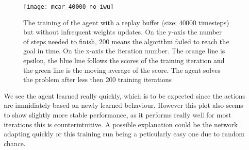 \begin{figure}
    \texttt{[image: mcar\_40000\_no\_iwu]}
    \caption{The training of the agent with a replay buffer (size: $40000$ timesteps) but without infrequent weights updates. On the y-axis the number of steps needed to finish, 200 means the algorithm failed to reach the goal in time. On the x-axis the iteration number. The orange line is epsilon, the blue line follows the scores of the training iteration and the green line is the moving average of the score. The agent solves the problem after less then 200 training iterations}
    \label{fig:no_iwu}
\end{figure}

We see the agent learned really quickly, which is to be expected since the actions are immidiately based on newly learned behaviour. However this plot also seems to show slightly more stable performance, as it performs really well for most iterations this is counterintuitive. A possible explanation could be the network adapting quickly or this training run being a peticularly easy one due to random chance.